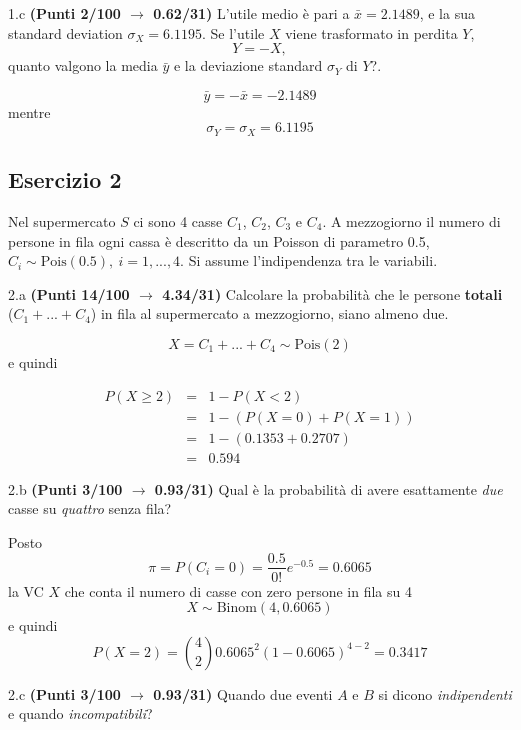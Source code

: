 \documentclass[
  11pt,
]{book}
\theoremstyle{mytheoremstyle}
\theoremstyle{mydefstyle}
\newenvironment{sol}
  {
  \begin{tcolorbox}[enhanced,breakable,arc=0.1mm,boxrule=1pt,colback=white,colframe=iblue,
  title=\bf \fontfamily{lmss}\selectfont \hspace{.5 cm} Soluzione,drop fuzzy shadow]

}{
\end{tcolorbox}
  }
\begin{document}
1.c \textbf{(Punti 2/100 \(\rightarrow\) 0.62/31)} L'utile medio è pari a \(\bar x=2.1489\), e la sua standard deviation
\(\sigma_X=6.1195\). Se l'utile \(X\) viene trasformato in perdita \(Y\),
\[
Y=-X,
\]
quanto valgono la media \(\bar y\) e la deviazione standard \(\sigma_Y\) di \(Y\)?.

\begin{sol}
\[
\bar y=-\bar x=-2.1489
\]
mentre
\[
\sigma_Y=\sigma_X=6.1195
\]

\end{sol}

\subsection{Esercizio 2}\label{esercizio-2-4}

Nel supermercato \(S\) ci sono 4 casse \(C_1\), \(C_2\), \(C_3\) e \(C_4\). A mezzogiorno il numero di persone in fila ogni cassa è descritto da un Poisson di parametro 0.5, \(C_i\sim\text{Pois}(0.5),~i=1,...,4\). Si assume l'indipendenza tra le variabili.

2.a \textbf{(Punti 14/100 \(\rightarrow\) 4.34/31)} Calcolare la probabilità che le persone \textbf{totali} (\(C_1+...+C_4\)) in fila al supermercato a mezzogiorno, siano almeno due.

\begin{sol}
\[
X=C_1+...+C_4\sim \text{Pois}(2)
\]
e quindi

\begin{eqnarray*}
P(X\ge 2)&=&1-P(X< 2)\\
&=&1-(P(X=0)+P(X=1))\\
&=&1-(0.1353+0.2707)\\
&=&0.594
\end{eqnarray*}

\end{sol}

2.b \textbf{(Punti 3/100 \(\rightarrow\) 0.93/31)} Qual è la probabilità di avere esattamente \emph{due} casse su \emph{quattro} senza fila?

\begin{sol}
Posto
\[
\pi = P(C_i=0)=\frac {0.5}{0!}e^{-0.5}=0.6065
\]
la VC \(X\) che conta il numero di casse con zero persone in fila su 4
\[
X\sim\text{Binom}(4,0.6065)
\]
e quindi
\[
P(X=2)=\binom{4}{2}0.6065^2(1-0.6065)^{4-2}=0.3417
\]

\end{sol}

2.c \textbf{(Punti 3/100 \(\rightarrow\) 0.93/31)} Quando due eventi \(A\) e \(B\) si dicono \emph{indipendenti} e quando \emph{incompatibili}?
\end{document}
